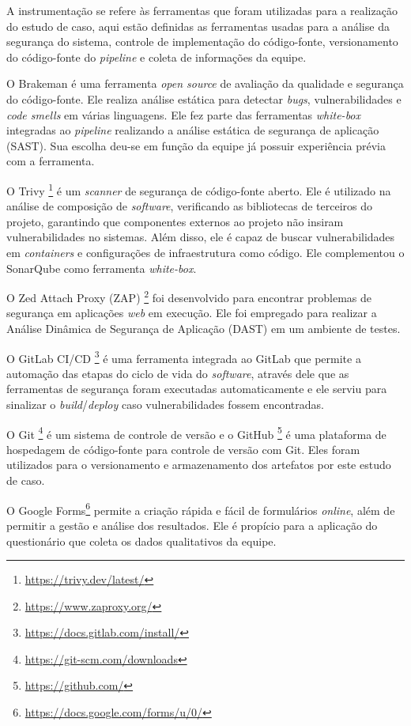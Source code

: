 A instrumentação se refere às ferramentas que foram utilizadas para a realização do estudo de caso, aqui estão definidas as ferramentas usadas para a análise da segurança do sistema, controle de implementação do código-fonte, versionamento do código-fonte do \textit{pipeline} e coleta de informações da equipe.

O Brakeman é uma ferramenta \textit{open source} de avaliação da qualidade e segurança do código-fonte. Ele realiza análise estática para detectar \textit{bugs}, vulnerabilidades e \textit{code smells} em várias linguagens. Ele fez parte das ferramentas \textit{white-box} integradas ao \textit{pipeline} realizando a análise estática de segurança de aplicação (SAST). Sua escolha deu-se em função da equipe já possuir experiência prévia com a ferramenta.

O Trivy \footnote{\href{https://trivy.dev/latest/}{https://trivy.dev/latest/}} é um \textit{scanner} de segurança de código-fonte aberto. Ele é utilizado na análise de composição de \textit{software}, verificando as bibliotecas de terceiros do projeto, garantindo que componentes externos ao projeto não insiram vulnerabilidades no sistemas. Além disso, ele é capaz de buscar vulnerabilidades em \textit{containers} e configurações de infraestrutura como código. Ele complementou o SonarQube como ferramenta \textit{white-box}.

O Zed Attach Proxy (ZAP) \footnote{\href{https://www.zaproxy.org/}{https://www.zaproxy.org/}} foi desenvolvido para encontrar problemas de segurança em aplicações \textit{web} em execução. Ele foi empregado para realizar a Análise Dinâmica de Segurança de Aplicação (DAST) em um ambiente de testes.

O GitLab CI/CD \footnote{\href{https://docs.gitlab.com/install/}{https://docs.gitlab.com/install/}} é uma ferramenta integrada ao GitLab que permite a automação das etapas do ciclo de vida do \textit{software}, através dele que as ferramentas de segurança foram executadas automaticamente e ele serviu para sinalizar o \textit{build}/\textit{deploy} caso vulnerabilidades fossem encontradas.

O Git \footnote{\href{https://git-scm.com/downloads}{https://git-scm.com/downloads}} é um sistema de controle de versão e o GitHub \footnote{\href{https://github.com/}{https://github.com/}} é uma plataforma de hospedagem de código-fonte para controle de versão com Git. Eles foram utilizados para o versionamento e armazenamento dos artefatos por este estudo de caso.

O Google Forms\footnote{\href{https://docs.google.com/forms/u/0/}{https://docs.google.com/forms/u/0/}} permite a criação rápida e fácil de formulários \textit{online}, além de permitir a gestão e análise dos resultados. Ele é propício para a aplicação do questionário que coleta os dados qualitativos da equipe.